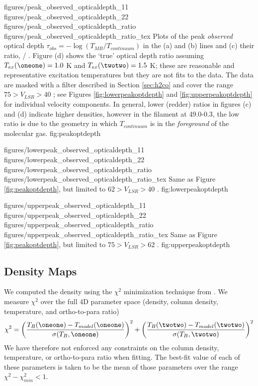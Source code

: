 \FigureFourPDF
{figures/peak_observed_opticaldepth_11}
{figures/peak_observed_opticaldepth_22}
{figures/peak_observed_opticaldepth_ratio}
{figures/peak_observed_opticaldepth_ratio_tex}
{Plots of the peak \emph{observed} optical depth $\tau_{obs} =
-\log(T_{MB}/T_{continuum})$ in the (a) \oneone and (b) \twotwo lines and (c)
their ratio, \oneone / \twotwo.  Figure (d) shows the `true' optical depth ratio
assuming $T_{ex}(\oneone) = 1.0$ K and $T_{ex}(\twotwo) = 1.5$ K; these are
reasonable and representative excitation temperatures but they are not fits to
the data.
The data are masked with a filter described in Section \ref{sec:h2co} and cover
the range $75 > V_{LSR} > 40$ \kms; see Figures \ref{fig:lowerpeakoptdepth} and
\ref{fig:upperpeakoptdepth} for individual velocity components.  In general,
lower (redder) ratios in figures (c) and (d) indicate higher densities, however
in the filament at 49.0-0.3, the low ratio is due to the geometry in which
$T_{continuum}$ is in the \emph{foreground} of the molecular gas.}
{fig:peakoptdepth}


\FigureFourPDF
{figures/lowerpeak_observed_opticaldepth_11}
{figures/lowerpeak_observed_opticaldepth_22}
{figures/lowerpeak_observed_opticaldepth_ratio}
{figures/lowerpeak_observed_opticaldepth_ratio_tex}
{Same as Figure \ref{fig:peakoptdepth}, but limited to $62 > V_{LSR} > 40$ \kms.}
{fig:lowerpeakoptdepth}

\FigureFourPDF
{figures/upperpeak_observed_opticaldepth_11}
{figures/upperpeak_observed_opticaldepth_22}
{figures/upperpeak_observed_opticaldepth_ratio}
{figures/upperpeak_observed_opticaldepth_ratio_tex}
{Same as Figure \ref{fig:peakoptdepth}, but limited to $75 > V_{LSR} > 62$ \kms.}
{fig:upperpeakoptdepth}

\subsection{Density Maps}
\label{sec:densmaps}
We computed the density using the $\chi^2$ minimization technique from
\citet{Ginsburg2011a}.  We measure $\chi^2$ over the full 4D parameter space (density, column density, temperature,
and ortho-to-para ratio)
\begin{equation}
    \label{eqn:chi2}
    \chi^2 =  \left( \frac{T_B(\oneone)-T_{model}(\oneone)}{\sigma(T_B,\oneone)}\right)^2 +
              \left( \frac{T_B(\twotwo)-T_{model}(\twotwo)}{\sigma(T_B,\twotwo)}\right)^2
\end{equation}
We have therefore not enforced any constraints on the column density,
temperature, or ortho-to-para ratio when fitting.
The best-fit value of each of these parameters is taken to be the mean of those
parameters over the range $\chi^2 - \chi^2_{min} < 1$.

